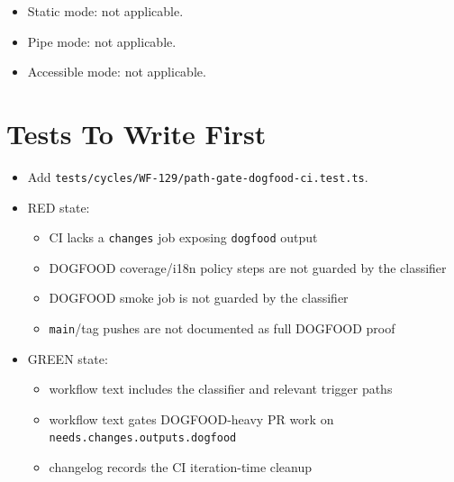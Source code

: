 \begin{itemize}
\tightlist
\item
  Static mode: not applicable.
\item
  Pipe mode: not applicable.
\item
  Accessible mode: not applicable.
\end{itemize}

\section{Tests To Write First}\label{record-211-tests-to-write-first}

\begin{itemize}
\tightlist
\item
  Add \texttt{t\allowbreak{}e\allowbreak{}s\allowbreak{}t\allowbreak{}s\allowbreak{}/\allowbreak{}c\allowbreak{}y\allowbreak{}c\allowbreak{}l\allowbreak{}e\allowbreak{}s\allowbreak{}/\allowbreak{}W\allowbreak{}F\allowbreak{}-\allowbreak{}1\allowbreak{}2\allowbreak{}9\allowbreak{}/\allowbreak{}p\allowbreak{}a\allowbreak{}t\allowbreak{}h\allowbreak{}-\allowbreak{}g\allowbreak{}a\allowbreak{}t\allowbreak{}e\allowbreak{}-\allowbreak{}d\allowbreak{}o\allowbreak{}g\allowbreak{}f\allowbreak{}o\allowbreak{}o\allowbreak{}d\allowbreak{}-\allowbreak{}c\allowbreak{}i\allowbreak{}.\allowbreak{}t\allowbreak{}e\allowbreak{}s\allowbreak{}t\allowbreak{}.\allowbreak{}t\allowbreak{}s}.
\item
  RED state:

  \begin{itemize}
  \tightlist
  \item
    CI lacks a \texttt{c\allowbreak{}h\allowbreak{}a\allowbreak{}n\allowbreak{}g\allowbreak{}e\allowbreak{}s} job exposing \texttt{d\allowbreak{}o\allowbreak{}g\allowbreak{}f\allowbreak{}o\allowbreak{}o\allowbreak{}d} output
  \item
    DOGFOOD coverage/i18n policy steps are not guarded by the classifier
  \item
    DOGFOOD smoke job is not guarded by the classifier
  \item
    \texttt{m\allowbreak{}a\allowbreak{}i\allowbreak{}n}/tag pushes are not documented as full DOGFOOD proof
  \end{itemize}
\item
  GREEN state:

  \begin{itemize}
  \tightlist
  \item
    workflow text includes the classifier and relevant trigger paths
  \item
    workflow text gates DOGFOOD-heavy PR work on \texttt{n\allowbreak{}e\allowbreak{}e\allowbreak{}d\allowbreak{}s\allowbreak{}.\allowbreak{}c\allowbreak{}h\allowbreak{}a\allowbreak{}n\allowbreak{}g\allowbreak{}e\allowbreak{}s\allowbreak{}.\allowbreak{}o\allowbreak{}u\allowbreak{}t\allowbreak{}p\allowbreak{}u\allowbreak{}t\allowbreak{}s\allowbreak{}.\allowbreak{}d\allowbreak{}o\allowbreak{}g\allowbreak{}f\allowbreak{}o\allowbreak{}o\allowbreak{}d}
  \item
    changelog records the CI iteration-time cleanup
  \end{itemize}
\end{itemize}

